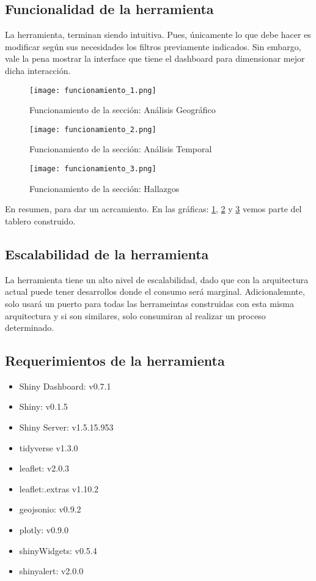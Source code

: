 \documentclass[a4paper]{article}
\begin{document}
\subsection{Funcionalidad de la herramienta}

La herramienta, terminan siendo intuitiva. Pues, únicamente lo que debe hacer es modificar según sus necesidades los filtros previamente indicados. Sin embargo, vale la pena mostrar la interface que tiene el dashboard para dimensionar mejor dicha interacción.

\begin{figure}[h]
    \centering
	\texttt{[image: funcionamiento\_1.png]}
    \caption{Funcionamiento de la sección: Análisis Geográfico}
    \label{fig:funcionamiento_1}
\end{figure}

\begin{figure}[h]
    \centering
	\texttt{[image: funcionamiento\_2.png]}
    \caption{Funcionamiento de la sección: Análisis Temporal}
    \label{fig:funcionamiento_2}
\end{figure}

\begin{figure}[h]
    \centering
	\texttt{[image: funcionamiento\_3.png]}
    \caption{Funcionamiento de la sección: Hallazgos}
    \label{fig:funcionamiento_3}
\end{figure}

En resumen, para dar un acrcamiento. En las gráficas: \ref{fig:funcionamiento_1}, \ref{fig:funcionamiento_2} y \ref{fig:funcionamiento_3} vemos parte del tablero construido.


\subsection{Escalabilidad de la herramienta}

La herramienta tiene un alto nivel de escalabilidad, dado que con la arquitectura actual puede tener desarrollos donde el consumo será marginal. Adicionalemnte, solo usará un puerto para todas las herrameintas construidas con esta misma arquitectura y si son similares, solo consumiran al realizar un proceso determinado.

\subsection{Requerimientos de la herramienta}

\begin{itemize}
	\item Shiny Dashboard: v0.7.1
	\item Shiny: v0.1.5
	\item Shiny Server: v1.5.15.953
	\item tidyverse v1.3.0
	\item leaflet: v2.0.3
	\item leaflet:.extras v1.10.2
	\item geojsonio: v0.9.2
	\item plotly: v0.9.0
	\item shinyWidgets: v0.5.4
	\item shinyalert: v2.0.0
\end{itemize}
\end{document}
